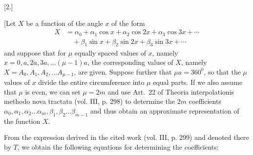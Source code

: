 \clearpage
\begin{landscape}
\begingroup
\fontsize{9.5}{12}\selectfont
{}
\renewcommand{\headrulewidth}{0pt}
\makeatletter\tagsleft@true\let\veqno\@@leqno\makeatother
\setlength{\lineskip}{4pt}\setlength{\lineskiplimit}{4pt}
\begin{center}[2.]\end{center}
\newcommand{\VtwoLowPoint}{\makebox[0pt][l]{\kern-.05em\raisebox{-.4ex}{\rule{.065em}{.065em}}}}
\newcommand{\VtwoMarkedSin}{\mathop{\mathrm{sin}\text{\llap{\raisebox{-.6ex}{\rule{.06em}{.06em}}\kern.1em}}}}
\newcommand{\VtwoMarkedL}{\mathord{L\text{\rlap{\kern.06em\raisebox{1.2ex}{\rule{.06em}{.06em}}}}}}
\newcommand{\VtwoLeader}{\mathord{.}\,\mathord{.}\,\mathord{.}\,\mathord{.}\,\mathord{.}\,\mathord{.}\,\mathord{.}\,\mathord{.}\,\mathord{.}\,\mathord{.}\,\mathord{.}\,\mathord{.}\,\mathord{.}\,\mathord{.}\,\mathord{.}\,\mathord{.}\,\mathord{.}\,\mathord{.}\,\mathord{.}\,\mathord{.}\,\mathord{.}\,\mathord{.}\,\mathord{.}\,\mathord{.}\,\mathord{.}}
\par\noindent\hspace*{\parindent}[Let \(X\) be a function of the angle \(x\) of the form
\[
\begin{aligned} X &= \alpha_0 + \alpha_1\cos x + \alpha_2\cos 2x + \alpha_3\cos 3x + \cdots \\ &\quad + \beta_1\sin x + \beta_2\sin 2x + \beta_3\sin 3x + \cdots \end{aligned}
\]
and suppose that for \(\mu\) equally spaced values of \(x\), namely \(x=0, a, 2a, 3a, \ldots (\mu-1)a\), the corresponding values of \(X\), namely \(X = A_0, A_1, A_2, \ldots A_{\mu-1}\), are given. Suppose further that \(\mu a = 360^{0}\), so that the \(\mu\) values of \(x\) divide the entire circumference into \(\mu\) equal parts. If we also assume that \(\mu\) is even, we can set \(\mu = 2m\) and use Art.\ 22 of Theoria interpolationis methodo nova tractata (vol. III, p. 298) to determine the \(2m\) coefficients \(\alpha_0, \alpha_1, \alpha_2 \ldots \alpha_m, \beta_1, \beta_2 \ldots \beta_{m-1}\) and thus obtain an approximate representation of the function \(X\).
\par\noindent\hspace*{\parindent}From the expression derived in the cited work (vol. III, p. 299) and denoted there by \(T\), we obtain the following equations for determining the coefficients:
\[
\]
\end{landscape}
